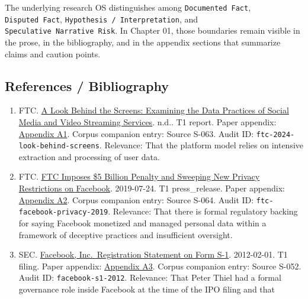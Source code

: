 \documentclass[
  american,
  11pt,
  letterpaper,
]{article}
\providecommand{\tightlist}{%
  \setlength{\itemsep}{0pt}\setlength{\parskip}{0pt}}
\begin{document}
The underlying research OS distinguishes among
\texttt{Documented\ Fact}, \texttt{Disputed\ Fact},
\texttt{Hypothesis\ /\ Interpretation}, and
\texttt{Speculative\ Narrative\ Risk}. In Chapter 01, those boundaries
remain visible in the prose, in the bibliography, and in the appendix
sections that summarize claims and caution points.

\subsection{References / Bibliography}\label{references-bibliography}

\begin{enumerate}
\def\labelenumi{\arabic{enumi}.}
\tightlist
\item
  FTC.
  \href{https://www.ftc.gov/reports/look-behind-screens-examining-data-practices-social-media-video-streaming-services}{A
  Look Behind the Screens: Examining the Data Practices of Social Media
  and Video Streaming Services}. n.d.. T1 report. Paper appendix:
  \hyperref[appendix-a1-a-look-behind-the-screens-examining-the-data-practices-of-social-media-and-video-streaming-services]{Appendix
  A1}. Corpus companion entry: Source S-063. Audit ID:
  \texttt{ftc-2024-look-behind-screens}. Relevance: That the platform
  model relies on intensive extraction and processing of user data.
\item
  FTC.
  \href{https://www.ftc.gov/news-events/news/press-releases/2019/07/ftc-imposes-5-billion-penalty-sweeping-new-privacy-restrictions-facebook}{FTC
  Imposes \$5 Billion Penalty and Sweeping New Privacy Restrictions on
  Facebook}. 2019-07-24. T1 press\_release. Paper appendix:
  \hyperref[appendix-a2-ftc-imposes-5-billion-penalty-and-sweeping-new-privacy-restrictions-on-facebook]{Appendix
  A2}. Corpus companion entry: Source S-064. Audit ID:
  \texttt{ftc-facebook-privacy-2019}. Relevance: That there is formal
  regulatory backing for saying Facebook monetized and managed personal
  data within a framework of deceptive practices and insufficient
  oversight.
\item
  SEC.
  \href{https://www.sec.gov/Archives/edgar/data/1326801/000119312512034517/d287954ds1.htm}{Facebook,
  Inc.~Registration Statement on Form S-1}. 2012-02-01. T1 filing. Paper
  appendix:
  \hyperref[appendix-a3-facebook-inc-registration-statement-on-form-s-1]{Appendix
  A3}. Corpus companion entry: Source S-052. Audit ID:
  \texttt{facebook-s1-2012}. Relevance: That Peter Thiel had a formal
  governance role inside Facebook at the time of the IPO filing and that

\end{enumerate}
\end{document}

